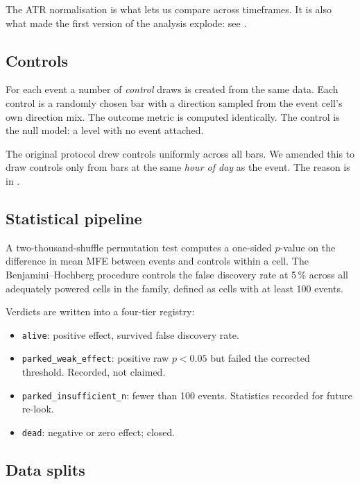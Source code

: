 \documentclass[11pt,a4paper]{article}
\begin{document}
The ATR normalisation is what lets us compare across timeframes. It is
also what made the first version of the analysis explode: see
.

\subsection{Controls}

For each event a number of \emph{control} draws is created from the same
data. Each control is a randomly chosen bar with a direction sampled
from the event cell's own direction mix. The outcome metric is computed
identically. The control is the null model: a level with no event
attached.

The original protocol drew controls uniformly across all bars. We
amended this to draw controls only from bars at the same \emph{hour of
day} as the event. The reason is in .

\subsection{Statistical pipeline}

A two-thousand-shuffle permutation test computes a one-sided $p$-value
on the difference in mean MFE between events and controls within a
cell. The Benjamini--Hochberg procedure controls the false discovery
rate at 5\,\% across all adequately powered cells in the family,
defined as cells with at least 100 events.

Verdicts are written into a four-tier registry:

\begin{itemize}
  \item \texttt{alive}: positive effect, survived false discovery rate.
  \item \texttt{parked\_weak\_effect}: positive raw $p < 0.05$ but
        failed the corrected threshold. Recorded, not claimed.
  \item \texttt{parked\_insufficient\_n}: fewer than 100 events.
        Statistics recorded for future re-look.
  \item \texttt{dead}: negative or zero effect; closed.
\end{itemize}

\subsection{Data splits}
\end{document}
